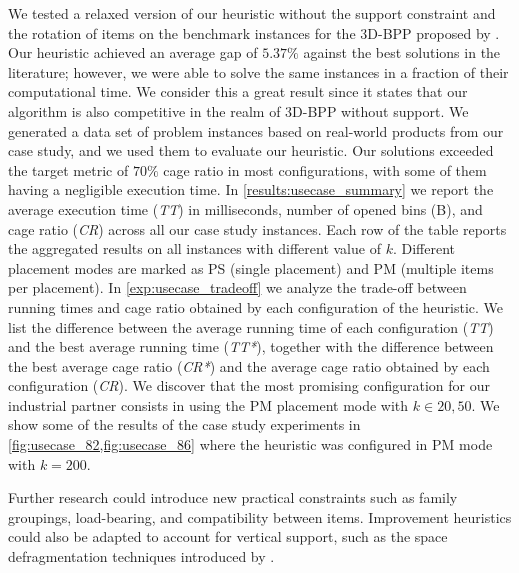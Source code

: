 \documentclass[11pt,a4paper,twocolumn]{article}
\begin{document}
We tested a relaxed version of our heuristic without the support constraint and the rotation of items on the benchmark instances for the 3D-BPP proposed by \cite{martello2000three}.
Our heuristic achieved an average gap of $5.37\%$ against the best solutions in the literature; however, we were able to solve the same instances in a fraction of their computational time.
We consider this a great result since it states that our algorithm is also competitive in the realm of 3D-BPP without support.
We generated a data set of problem instances based on real-world products from our case study, and we used them to evaluate our heuristic.
Our solutions exceeded the target metric of $70\%$ cage ratio in most configurations, with some of them having a negligible execution time.
In \cref{results:usecase_summary} we report the average execution time (\textit{TT}) in milliseconds, number of opened bins (B), and cage ratio (\textit{CR}) across all our case study instances. Each row of the table reports the aggregated results on all instances with different value of $k$.
Different placement modes are marked as PS (single placement) and PM (multiple items per placement).
In \cref{exp:usecase_tradeoff} we analyze the trade-off between running times and cage ratio obtained by each configuration of the heuristic.
We list the difference between the average running time of each configuration (\textit{TT}) and the best average running time (\textit{TT*}), together with the difference between the best average cage ratio (\textit{CR*}) and the average cage ratio obtained by each configuration (\textit{CR}).
We discover that the most promising configuration for our industrial partner consists in using the PM placement mode with $k \in {20, 50}$.
We show some of the results of the case study experiments in \cref{fig:usecase_82,fig:usecase_86} where the heuristic was configured in PM mode with $k=200$.

Further research could introduce new practical constraints such as family groupings, load-bearing, and compatibility between items.
Improvement heuristics could also be adapted to account for vertical support, such as the space defragmentation techniques introduced by \cite{ZHU2012452}.



\end{document}
